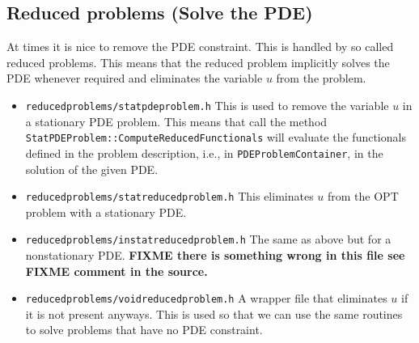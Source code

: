\subsection{Reduced problems (Solve the PDE)}
At times it is nice to remove the PDE constraint. This is handled by so called reduced 
problems. This means that the reduced problem implicitly solves the PDE whenever required
and eliminates the variable $u$ from the problem.
\begin{itemize}
\item {\tt reducedproblems/statpdeproblem.h} This is used to remove the variable $u$ in 
  a stationary PDE problem. This means that call the method \\
  {\tt StatPDEProblem::ComputeReducedFunctionals} will evaluate the functionals 
  defined in the problem description, i.e., in {\tt PDEProblemContainer}, in the 
  solution of the given PDE.
\item {\tt reducedproblems/statreducedproblem.h} This eliminates $u$ from the OPT
  problem with a stationary PDE.
\item {\tt reducedproblems/instatreducedproblem.h} The same as above but for a
  nonstationary PDE. {\bf FIXME there is something wrong in this file see FIXME 
    comment in the source.}
\item {\tt reducedproblems/voidreducedproblem.h} A wrapper file that eliminates $u$ 
  if it is not present anyways. This is used so that we can use the same routines to 
  solve problems that have no PDE constraint.
\end{itemize}

